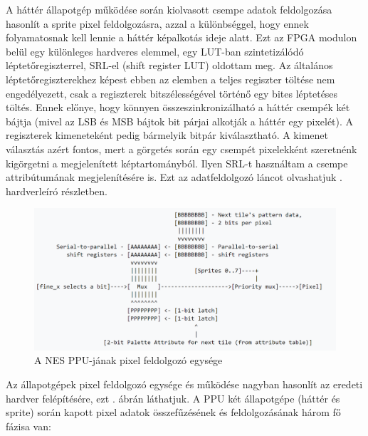 	A háttér állapotgép működése során kiolvasott csempe adatok feldolgozása hasonlít a sprite pixel feldolgozásra, azzal a különbséggel, hogy ennek folyamatosnak kell lennie a háttér képalkotás ideje alatt. Ezt az FPGA modulon belül egy különleges hardveres elemmel, egy LUT-ban szintetizálódó léptetőregiszterrel, SRL-el (shift register LUT) oldottam meg. %
	Az általános léptetőregiszterekhez képest ebben az elemben a teljes regiszter töltése nem engedélyezett, csak a regiszterek bitszélességével történő egy bites léptetéses töltés. %
	Ennek előnye, hogy könnyen összeszinkronizálható a háttér csempék két bájtja (mivel az LSB és MSB bájtok bit párjai alkotják a háttér egy pixelét). A regiszterek kimeneteként pedig bármelyik bitpár kiválasztható. A kimenet választás azért fontos, mert a görgetés során egy csempét pixelekként szeretnénk kigörgetni a megjelenített képtartományból. Ilyen SRL-t használtam a csempe attribútumának megjelenítésére is. Ezt az adatfeldolgozó láncot olvashatjuk . hardverleíró részletben.
	
	\begin{figure}[H]
	\centering
	\includegraphics[width=120mm, keepaspectratio]{figures/NES-render-chamber}
	\caption{A NES PPU-jának pixel feldolgozó egysége} 
	\label{fig:NES-render-chamber}
	\end{figure} 
	
	Az állapotgépek pixel feldolgozó egysége és működése nagyban hasonlít az eredeti hardver felépítésére, ezt . ábrán láthatjuk. A PPU két állapotgépe (háttér és sprite) során kapott pixel adatok összefűzésének és feldolgozásának három fő fázisa van: %
	
